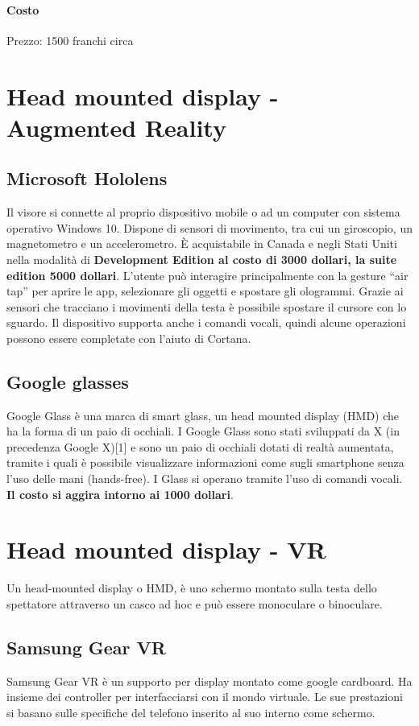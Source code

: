 \documentclass[8pt]{extarticle}
\begin{document}
\begin{multicols}{3}
\paragraph{Costo}
Prezzo: 1500 franchi circa
\section{Head mounted display - Augmented Reality}
\subsection{Microsoft Hololens}
Il visore si connette al proprio dispositivo mobile o ad un computer con sistema operativo Windows 10.
Dispone di sensori di movimento, tra cui un giroscopio, un magnetometro e un accelerometro.
È acquistabile in Canada e negli Stati Uniti nella modalità di \textbf{Development Edition al costo di 3000 dollari, la suite edition 5000 dollari}.
L’utente può interagire principalmente con la gesture “air tap” per aprire le app, selezionare gli oggetti e spostare gli ologrammi. Grazie ai sensori che tracciano i movimenti della testa è possibile spostare il cursore con lo sguardo. Il dispositivo supporta anche i comandi vocali, quindi alcune operazioni possono essere completate con l’aiuto di Cortana.
\subsection{Google glasses}
Google Glass è una marca di smart glass, un head mounted display (HMD) che ha la forma di un paio di occhiali. I Google Glass sono stati sviluppati da X (in precedenza Google X)[1] e sono un paio di occhiali dotati di realtà aumentata, tramite i quali è possibile visualizzare informazioni come sugli smartphone senza l'uso delle mani (hands-free). I Glass si operano tramite l'uso di comandi vocali.
\textbf{Il costo si aggira intorno ai 1000 dollari}.

\section{Head mounted display - VR}
Un head-mounted display o HMD, è uno schermo montato sulla testa dello spettatore attraverso un casco ad hoc e può essere monoculare o binoculare.
\subsection{Samsung Gear VR}
Samsung Gear VR è un supporto per display montato come google cardboard.
Ha insieme dei controller per interfacciarsi con il mondo virtuale.
Le sue prestazioni si basano sulle specifiche del telefono inserito al suo interno come schermo.

\end{multicols}
\end{document}
